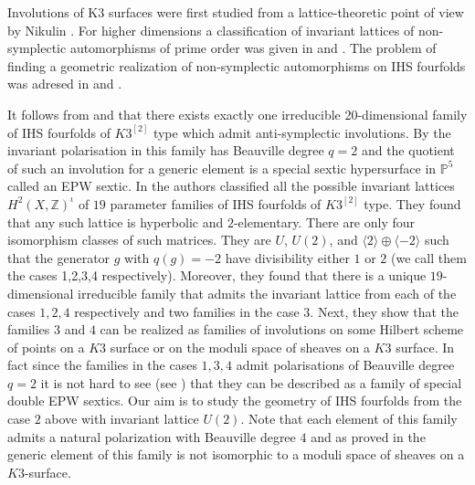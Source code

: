 \documentclass[a4paper,11pt]{amsart}
\theoremstyle{definition}
\numberwithin{equation}{section}
\numberwithin{equation}{section} \theoremstyle{definition}
\begin{document}
 Involutions of K3  surfaces were first studied from a lattice-theoretic point of view by Nikulin  \cite{Nikulin}. For higher dimensions a classification of invariant lattices of non-symplectic automorphisms of
prime order was given in \cite{BCS} and \cite{BCMS}. The problem of finding a geometric realization of non-symplectic automorphisms on IHS fourfolds was adresed in \cite{OW} and \cite{MongardiWandel}.

It follows from \cite[3.4, Theorem 2]{beau-invo} and \cite{OgradyEPW} that there exists exactly one irreducible 20-dimensional family of IHS fourfolds of $K3^{[2]}$ 
type  which admit anti-symplectic involutions. By \cite{OgradyEPW} the invariant polarisation in this family has Beauville degree $q=2$ and the quotient of such an involution for a generic element is a special sextic hypersurface in ${{\mathbb{P}}}^5$ called an EPW sextic. 
In \cite{OW} the authors classified all the possible invariant lattices $H^2(X,\mathbb{Z})^{\iota}$ of $19$ parameter families of IHS fourfolds of $K3^{[2]}$ type.
They found that any such lattice is hyperbolic and $2$-elementary. There are only four isomorphism classes of such matrices.  They are $U$, $U(2)$, and $\langle 2\rangle \oplus \langle -2\rangle$ such that the generator $g$ with $q(g)=-2$ have divisibility either $1$ or $2$ (we call them the cases 1,2,3,4 respectively). Moreover, they found that there is a unique $19$-dimensional irreducible family that admits the invariant lattice from each of the cases $1,2,4$ respectively and two families in the case $3$. Next, they show that the families $3$ and $4$ can be realized
as families of involutions on some Hilbert scheme of points on a $K3$ surface or on the moduli space of sheaves on a $K3$ surface. In fact since the families in the cases $1,3,4$ admit polarisations of Beauville degree $q=2$ it is not hard to see (see \cite[Rem.~5.7]{MongardiWandel}) that they can be described as a family of special double EPW sextics. 
Our aim is to study the geometry of IHS fourfolds from the case $2$ above with invariant lattice $U(2)$. Note that each element of this family admits a natural polarization with Beauville degree $4$ and as proved in \cite[Proposition.~4]{Addington} the generic element of this family is not isomorphic to a moduli space of sheaves on a $K3$-surface.
\end{document}
